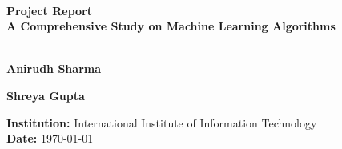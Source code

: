 \begin{titlepage}
    \centering

    \HRule \\[0.5cm]
    {\Huge \bfseries Project Report \\[0.4cm]
    \Large A Comprehensive Study on Machine Learning Algorithms}\\[0.5cm]
    \HRule \\[1.5cm]

    \begin{minipage}{0.45\textwidth}
        \centering
        \textbf{Anirudh Sharma} \\[0.2cm]
    \end{minipage}
    \hfill
    \begin{minipage}{0.45\textwidth}
        \centering
        \textbf{Shreya Gupta} \\[0.2cm]
    \end{minipage}

    \vfill

    \textbf{Institution:} International Institute of Information Technology \\[0.5cm]
    \textbf{Date:} \today \\[2cm]

\end{titlepage}
